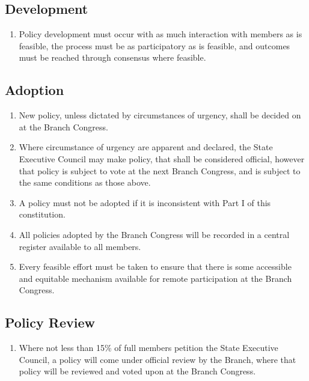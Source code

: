 \documentclass[a4paper,titlepage,8.5pt]{article}
\newcommand{\stateorterritory}{State}
\begin{document}
\subsection{Development}

\begin{enumerate}
\item Policy development must occur with as much interaction with members as is feasible, the process must be as participatory as is feasible, and outcomes must be reached through consensus where feasible.
\end{enumerate}

\subsection{Adoption}

\begin{enumerate}
\item New policy, unless dictated by circumstances of urgency, shall be decided on at the Branch Congress.
\item Where circumstance of urgency are apparent and declared, the {\stateorterritory} Executive Council may make policy, that shall be considered official, however that policy is subject to vote at the next Branch Congress, and is subject to the same conditions as those above.
\item A policy must not be adopted if it is inconsistent with Part I of this constitution.
\item All policies adopted by the Branch Congress will be recorded in a central register available to all members.
\item Every feasible effort must be taken to ensure that there is some accessible and equitable mechanism available for remote participation at the Branch Congress.
\end{enumerate}

\subsection{Policy Review}

\begin{enumerate}
\item Where not less than 15\% of full members petition the {\stateorterritory} Executive Council, a policy will come under official review by the Branch, where that policy will be reviewed and voted upon at the Branch Congress.
\end{enumerate}
\end{document}
